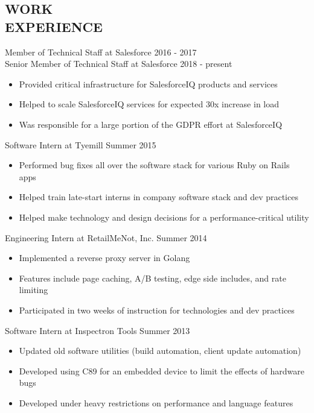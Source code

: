 \documentclass[line,margin]{res}
\begin{document}
\begin{resume}
\section{\textcolor{HeaderColor}{WORK \\ EXPERIENCE}} 

	      {\sc Member of Technical Staff at Salesforce} \hfill 2016 - 2017 \\
	      {\sc Senior Member of Technical Staff at Salesforce} \hfill 2018 - present
                 \begin{itemize}  \itemsep -2pt %
	      \item Provided critical infrastructure for SalesforceIQ products and services
                 \item Helped to scale SalesforceIQ services for expected 30x increase in load
                 \item Was responsible for a large portion of the GDPR effort at SalesforceIQ
                 \end{itemize}

                {\sc Software Intern at Tyemill} \hfill Summer 2015
                 \begin{itemize}  \itemsep -2pt %
                 \item Performed bug fixes all over the software stack for various Ruby on Rails apps
	      \item Helped train late-start interns in company software stack and dev practices
	      \item Helped make technology and design decisions for a performance-critical utility
                 \end{itemize}

                {\sc Engineering Intern at RetailMeNot, Inc.} \hfill Summer 2014
                 \begin{itemize}  \itemsep -2pt %
                 \item Implemented a reverse proxy server in Golang
                 \item Features include page caching, A/B testing, edge side includes, and rate limiting
                 \item Participated in two weeks of instruction for technologies and dev practices
                 \end{itemize}

                {\sc Software Intern at Inspectron Tools} \hfill Summer 2013
                 \begin{itemize}  \itemsep -2pt %
                 \item Updated old software utilities (build automation, client update automation)
                 \item Developed using C89 for an embedded device to limit the effects of hardware bugs
                 \item Developed under heavy restrictions on performance and language features
                 \end{itemize}
 

\end{resume}
\end{document}
